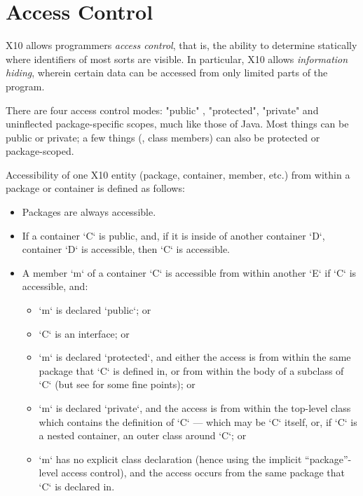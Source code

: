 \section{Access Control}

X10 allows programmers {\em access control}, that is, the ability to determine
statically where identifiers of most sorts are visible.  In particular, X10
allows {\em information hiding}, wherein certain data can be accessed from
only limited parts of the program. 

There are four access control modes: 
\xcd"public" , \xcd"protected", \xcd"private"
and uninflected package-specific scopes, much like those of Java. 
Most things can be public or private; a few things (\eg, class members) can
also be protected or package-scoped.  

Accessibility of one X10 entity (package, container, member, etc.) from within
a package or container is defined as follows: 
\begin{itemize}
\item Packages are always accessible.
\item If a container \xcd`C` is public, and, if it is inside of another
      container \xcd`D`,
      container \xcd`D` is accessible, then \xcd`C` is accessible.  
\item A member \xcd`m` of a container \xcd`C` is accessible from within
      another  \xcd`E`
      if \xcd`C` is
      accessible, and: 
      \begin{itemize}
      \item \xcd`m` is declared \xcd`public`; or
      \item \xcd`C` is an interface; or
      \item \xcd`m` is declared \xcd`protected`, and either the access is from
            within the same package that \xcd`C` is defined in, or from within
            the body of a subclass of \xcd`C` (but see
             for some fine points); or
      \item \xcd`m` is declared \xcd`private`, and the access is from within
            the top-level class which contains the definition of \xcd`C` ---
            which may be \xcd`C` itself, or, if \xcd`C` is a nested container, an
            outer class around \xcd`C`; or
      \item \xcd`m` has no explicit class declaration (hence using the
            implicit ``package''-level access control), and the access occurs
            from the same package that \xcd`C` is declared in.
      \end{itemize}
\end{itemize}

